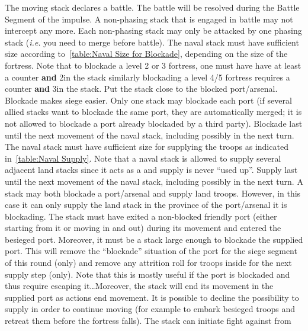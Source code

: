 \label{chMilitary:Moves:Active Naval}
\bparag[Battle.] The moving stack declares a battle. The battle will be
resolved during the Battle Segment of the impulse. A non-phasing stack that is
engaged in battle may not intercept any more. Each non-phasing stack may only
be attacked by one phasing stack (\emph{i.e.} you need to merge before
battle).
 The naval stack must have
sufficient size according to~\ref{table:Naval Size for Blockade}, depending on
the size of the fortress. Note that to blockade a level 2 or 3 fortress, one
must have have at least a \FLEET\Facemoins counter \textbf{and} 2\ND in the
stack similarly blockading a level 4/5 fortress requires a \FLEET\Faceplus
counter \textbf{and} 3\ND in the stack. Put the stack close to the blocked
port/arsenal. Blockade makes siege easier. Only one stack may blockade each
port (if several allied stacks want to blockade the same port, they are
automatically merged; it is not allowed to blockade a port already blockaded
by a third party). Blockade last until the next movement of the naval stack,
including possibly in the next turn.
 The naval stack must have sufficient size for
supplying the troops as indicated in~\ref{table:Naval Supply}. Note that a
naval stack is allowed to supply several adjacent land stacks since it acts as
a \SoS and supply is never ``used up''. Supply last until the next movement of
the naval stack, including possibly in the next turn.
 A stack may both blockade a port/arsenal and
supply land troops. However, in this case it can only supply the land stack in
the province of the port/arsenal it is blockading.
 The stack must have exited a non-blocked
friendly port (either starting from it or moving in and out) during its
movement and entered the besieged port. Moreover, it must be a stack large
enough to blockade the supplied port. This will remove the ``blockade''
situation of the port for the siege segment of this round (only) and remove
any attrition roll for troops inside for the next supply step (only). Note
that this is mostly useful if the port is blockaded and thus require escaping
it\ldots Moreover, the stack will end its movement in the supplied port as
actions end movement. It is possible to decline the possibility to supply in
order to continue moving (for example to embark besieged troops and retreat
them before the fortress falls).
 The stack can initiate fight against \corsaire from
